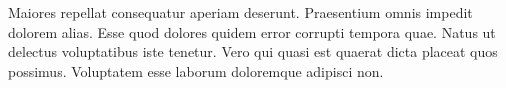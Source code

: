 \documentclass[a4paper]{article}
\begin{document}
Maiores repellat consequatur aperiam deserunt.
Praesentium omnis impedit dolorem alias. 
Esse quod dolores quidem error corrupti tempora quae.
Natus ut delectus voluptatibus iste tenetur.
Vero qui quasi est quaerat dicta placeat quos possimus.
Voluptatem esse laborum doloremque adipisci non.
\end{document}
